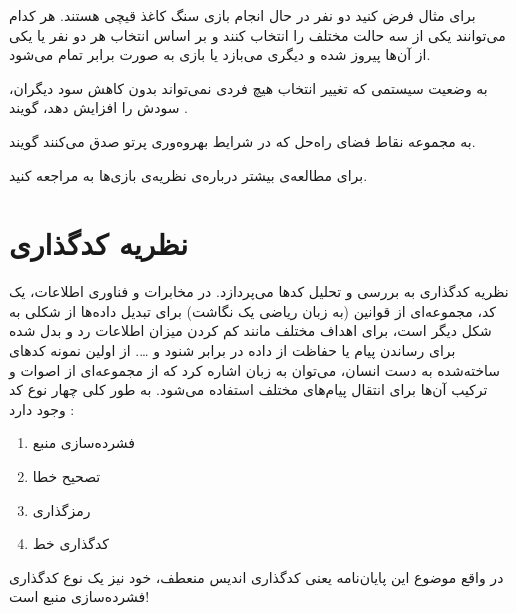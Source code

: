 برای مثال فرض کنید دو نفر در حال انجام بازی سنگ کاغذ قیچی هستند. هر کدام می‌توانند یکی از سه حالت مختلف را انتخاب کنند و بر اساس انتخاب هر دو نفر یا یکی از آن‌ها پیروز شده و دیگری می‌بازد یا بازی به صورت برابر تمام می‌شود.
\begin{definition}
	\label{def:Pareto}
	به وضعیت سیستمی که تغییر انتخاب هیچ فردی نمی‌تواند بدون کاهش سود دیگران، سودش را افزایش دهد، گویند
	\cite{wiki:pareto}.
	\end{definition}
		\begin{definition}
	\label{def:Pareto-boundary}
	به مجموعه نقاط فضای راه‌حل که در شرایط بهروه‌وری پرتو صدق می‌کنند گویند.
\end{definition}

	برای مطالعه‌ی بیشتر درباره‌ی نظریه‌ی بازی‌ها به
\cite{book:game}
مراجعه کنید.
\section{نظریه کدگذاری}
نظریه کدگذاری به بررسی و تحلیل کد‌ها می‌پردازد. در مخابرات و فناوری اطلاعات، یک کد، مجموعه‌‌ای از قوانین (به زبان ریاضی یک نگاشت‌) برای تبدیل داده‌ها از شکلی به شکل دیگر است، برای اهداف مختلف مانند کم‌ کردن میزان اطلاعات رد و بدل‌‌ شده برای رساندن پیام یا حفاظت از داده در برابر شنود و \dots .
از اولین نمونه‌ کدهای ساخته‌شده به دست انسان، می‌توان به زبان اشاره کرد که از مجموعه‌ای از اصوات و ترکیب آن‌ها برای انتقال پیام‌های مختلف استفاده می‌شود. به طور کلی چهار نوع کد وجود دارد \cite{wiki:coding1, wiki:coding2}:
\begin{enumerate}
	\item فشرده‌سازی منبع
	\item تصحیح خطا
	\item رمزگذاری
	\item کدگذاری خط
\end{enumerate}

در واقع موضوع این پایان‌نامه یعنی کدگذاری اندیس منعطف، خود نیز یک نوع کدگذاری فشرده‌سازی منبع است!

